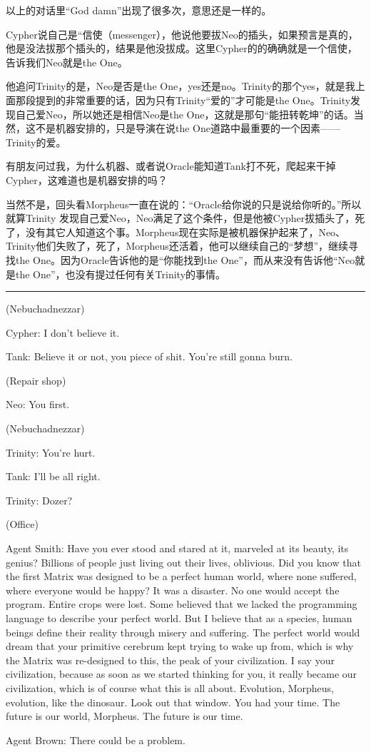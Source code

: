 \documentclass[UTF8]{ctexart}
\newcommand{\myparsep}{\noindent \rule[0.5ex]{\linewidth}{1pt}}
\newenvironment{myquote}{\color{green} \setlength{\leftskip}{6em} \setlength{\rightskip}{4em} \setlength{\parindent}{-2em}}{\par}
\begin{document}
以上的对话里“God damn”出现了很多次，意思还是一样的。

Cypher说自己是“信使（messenger），他说他要拔Neo的插头，如果预言是真的，他是没法拔那个插头的，结果是他没拔成。这里Cypher的的确确就是一个信使，告诉我们Neo就是the One。

他追问Trinity的是，Neo是否是the One，yes还是no。Trinity的那个yes，就是我上面那段提到的非常重要的话，因为只有Trinity“爱的”才可能是the One。Trinity发现自己爱Neo，所以她还是相信Neo是the One，这就是那句“能扭转乾坤”的话。当然，这不是机器安排的，只是导演在说the One道路中最重要的一个因素——Trinity的爱。

有朋友问过我，为什么机器、或者说Oracle能知道Tank打不死，爬起来干掉Cypher，这难道也是机器安排的吗？

当然不是，回头看Morpheus一直在说的：“Oracle给你说的只是说给你听的。”所以就算Trinity 发现自己爱Neo，Neo满足了这个条件，但是他被Cypher拔插头了，死了，没有其它人知道这个事。Morpheus现在实际是被机器保护起来了，Neo、Trinity他们失败了，死了，Morpheus还活着，他可以继续自己的“梦想”，继续寻找the One。因为Oracle告诉他的是“你能找到the One”，而从来没有告诉他“Neo就是the One”，也没有提过任何有关Trinity的事情。

\myparsep

\begin{myquote}
(Nebuchadnezzar)

Cypher: I don't believe it.

Tank: Believe it or not, you piece of shit. You're still gonna burn.

(Repair shop)

Neo: You first.

(Nebuchadnezzar)

Trinity: You're hurt.

Tank: I'll be all right.

Trinity: Dozer?

(Office)

Agent Smith: Have you ever stood and stared at it, marveled at its beauty, its genius? Billions of people just living out their lives, oblivious. Did you know that the first Matrix was designed to be a perfect human world, where none suffered, where everyone would be happy? It was a disaster. No one would accept the program. Entire crops were lost. Some believed that we lacked the programming language to describe your perfect world. But I believe that as a species, human beings define their reality through misery and suffering. The perfect world would dream that your primitive cerebrum kept trying to wake up from, which is why the Matrix was re-designed to this, the peak of your civilization. I say your civilization, because as soon as we started thinking for you, it really became our civilization, which is of course what this is all about. Evolution, Morpheus, evolution, like the dinosaur. Look out that window. You had your time. The future is our world, Morpheus. The future is our time.

Agent Brown: There could be a problem.
\end{myquote}
\end{document}
